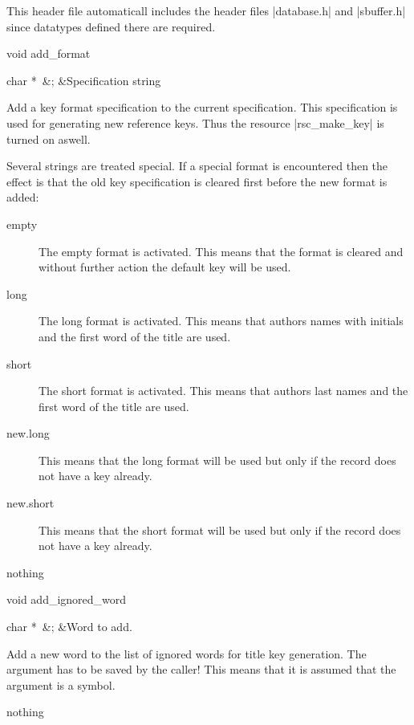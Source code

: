 This header file automaticall includes the header files
|database.h| and |sbuffer.h| since datatypes defined there are
required. 



\begin{Function}{void }{add\_format}
  \begin{Arguments}
    char *\ 	&;	&Specification string
  \end{Arguments}%
  Add a key format specification to the current
  specification.  This specification is used for
  generating new reference keys. Thus the resource
  |rsc_make_key| is turned on aswell.
  
  Several strings are treated special. If a special
  format is encountered then the effect is that the old
  key specification is cleared first before the new
  format is added:
  \begin{description}
  \item[empty] The empty format is activated. This means that
  the format is cleared and without further action the
  default key will be used.
  \item[long] The long format is activated. This means that
  authors names with initials and the first word of
  the title are used.
  \item[short] The short format is activated. This means that
  authors last names and the first word of the title
  are used. 
  \item[new.long] This means that the long format will
  be used but only if the record does not have a key
  already. 
  \item[new.short] This means that the short format will
  be used but only if the record does not have a key
  already. 
  \end{description}
  \begin{Result}
    nothing
  \end{Result}
\end{Function}
\begin{Function}{void }{add\_ignored\_word}
  \begin{Arguments}
    char *\ 	&;	&Word to add.
  \end{Arguments}%
  Add a new word to the list of ignored words for title
  key generation.
  The argument has to be saved by the caller! This means
  that it is assumed that the argument is a symbol.
  \begin{Result}
    nothing
  \end{Result}
\end{Function}
